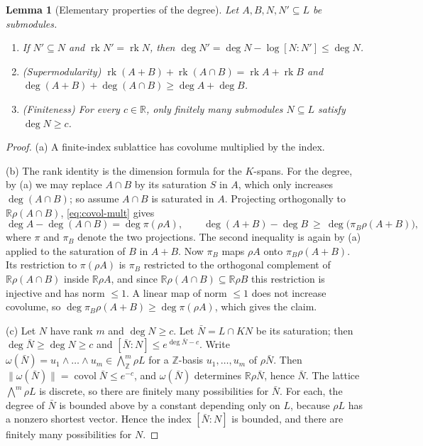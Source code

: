 \documentclass[10pt]{amsart}
\newtheorem{lemma}[theorem]{Lemma}
\theoremstyle{definition}
\theoremstyle{remark}
\newcommand{\R}{\mathbb R}
\newcommand{\Z}{\mathbb Z}
\begin{document}
\begin{lemma}[Elementary properties of the degree]\label{lem:deg-basic}
Let $A,B,N,N'\subseteq L$ be submodules.
\begin{enumerate}
\item[(a)] If $N'\subseteq N$ and $\operatorname{rk}N'=\operatorname{rk}N$, then $\deg N'=\deg N-\log[N:N']\le\deg N$.
\item[(b)] \emph{(Supermodularity)} $\operatorname{rk}(A+B)+\operatorname{rk}(A\cap B)=\operatorname{rk}A+\operatorname{rk}B$ and $\deg(A+B)+\deg(A\cap B)\ge\deg A+\deg B$.
\item[(c)] \emph{(Finiteness)} For every $c\in\R$, only finitely many submodules $N\subseteq L$ satisfy $\deg N\ge c$.
\end{enumerate}
\end{lemma}
\begin{proof}
(a) A finite-index sublattice has covolume multiplied by the index.

(b) The rank identity is the dimension formula for the $K$-spans. For the degree, by (a) we may replace $A\cap B$ by its saturation $S$ in $A$, which only increases $\deg(A\cap B)$; so assume $A\cap B$ is saturated in $A$. Projecting orthogonally to $\R\rho(A\cap B)$, \eqref{eq:covol-mult} gives
\[
\deg A-\deg(A\cap B)=\deg\pi(\rho A),\qquad \deg(A+B)-\deg B\ \ge\ \deg\bigl(\pi_B\rho(A+B)\bigr),
\]
where $\pi$ and $\pi_B$ denote the two projections. The second inequality is again by (a) applied to the saturation of $B$ in $A+B$. Now $\pi_B$ maps $\rho A$ onto $\pi_B\rho(A+B)$. Its restriction to $\pi(\rho A)$ is $\pi_B$ restricted to the orthogonal complement of $\R\rho(A\cap B)$ inside $\R\rho A$, and since $\R\rho(A\cap B)\subseteq\R\rho B$ this restriction is injective and has norm $\le1$. A linear map of norm $\le 1$ does not increase covolume, so $\deg\pi_B\rho(A+B)\ge\deg\pi(\rho A)$, which gives the claim.

(c) Let $N$ have rank $m$ and $\deg N\ge c$. Let $\bar N=L\cap KN$ be its saturation; then $\deg\bar N\ge\deg N\ge c$ and $[\bar N:N]\le e^{\deg\bar N-c}$. Write $\omega(\bar N)=u_1\wedge\dots\wedge u_m\in\bigwedge^m_\Z\rho L$ for a $\Z$-basis $u_1,\dots,u_m$ of $\rho\bar N$. Then $\|\omega(\bar N)\|=\operatorname{covol}\bar N\le e^{-c}$, and $\omega(\bar N)$ determines $\R\rho\bar N$, hence $\bar N$. The lattice $\bigwedge^m\rho L$ is discrete, so there are finitely many possibilities for $\bar N$. For each, the degree of $\bar N$ is bounded above by a constant depending only on $L$, because $\rho L$ has a nonzero shortest vector. Hence the index $[\bar N:N]$ is bounded, and there are finitely many possibilities for $N$.
\end{proof}
\end{document}
